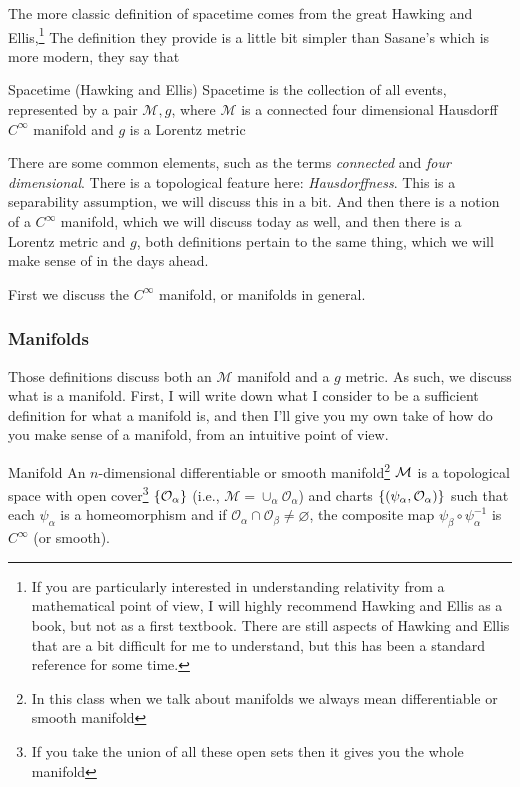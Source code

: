 		The more classic definition of spacetime comes from the great Hawking and Ellis\cite{HawkingEllis1973},\footnote{If you are particularly interested in understanding relativity from a mathematical point of view, I will highly recommend Hawking and Ellis as a book, but not as a first textbook. There are still aspects of Hawking and Ellis that are a bit difficult for me to understand, but this has been  a standard reference for some time.}
		The definition they provide is a little bit simpler than Sasane's which is more modern, they say that
		\begin{definition}{Spacetime (Hawking and Ellis)}
			\label{def:spacetime-hawking}
			Spacetime is the collection of all events, represented by a pair $\mathcal{M},g$, where $\mathcal{M}$ is a connected
			four dimensional Hausdorff $C^\infty$ manifold and $g$ is a Lorentz metric
		\end{definition}
		There are some common elements, such as the terms \textit{connected} and \textit{four dimensional}. There is a topological
		feature here: \textit{Hausdorffness}. This is a separability assumption, we will discuss this in a bit. And then there is a 
		notion of a $C^\infty$ manifold, which we will discuss today as well, and then there is a Lorentz metric and $g$, both 
		definitions pertain to the same thing, which we will make sense of in the days ahead. 

		First we discuss the $C^\infty$ manifold, or manifolds in general.

	\subsubsection{Manifolds}
		Those definitions discuss both an $\mathcal{M}$ manifold and a $g$ metric. As such, we discuss what is a manifold. 
		First, I will write down what I consider to be a sufficient definition for what a manifold is, and then I'll give 
		you my own take of how do you make sense of a manifold, from an intuitive point of view. 

		\begin{definition}{Manifold}
			An $n$-dimensional differentiable or smooth manifold\footnote{In this class when we talk about manifolds we always mean differentiable or smooth manifold} $\mathcal M$
			is a topological space with open cover\footnote{If you take the union of all these open sets then it gives you the whole manifold} 
			$\qty{\mathcal{O}_\alpha}$ (i.e., $\mathcal M = \cup_\alpha \mathcal{O}_\alpha$)
			and charts $\qty{(\psi_\alpha, \mathcal{O}_\alpha)}$ such that each $\psi_\alpha$ is a homeomorphism and if $\mathcal{O}_\alpha \cap \mathcal{O}_\beta\neq\varnothing$, the composite map $\psi_\beta \circ \psi_\alpha^{-1}$ is
			$C^\infty$ (or smooth).
		\end{definition}

